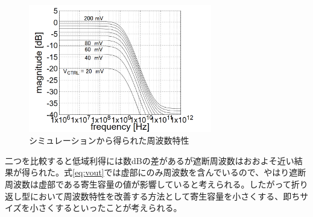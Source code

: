 \documentclass[twocolumn]{jsarticle}
\begin{document}
    \begin{figure}[H]
        \begin{center}
            \includegraphics*[width = 80mm]{figures/vout_ac_simulation_monochrome.PNG}
            \caption{シミュレーションから得られた周波数特性}
            \label{fig:vout_sim}
        \end{center}
    \end{figure}
    \clearpage
    二つを比較すると低域利得には数dBの差があるが遮断周波数はおおよそ近い結果が得られた。式\eqref{eq:vout}では虚部にのみ周波数を含んでいるので、やはり遮断周波数は虚部である寄生容量の値が影響していると考えられる。したがって折り返し型において周波数特性を改善する方法として寄生容量を小さくする、即ちサイズを小さくするといったことが考えられる。
\end{document}
